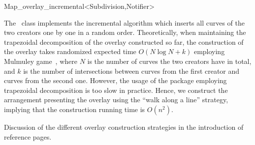 
\ccRefPageBegin


\renewcommand{\ccRefPageBegin}{\begin{ccAdvanced}}
\renewcommand{\ccRefPageEnd}{\end{ccAdvanced}}

\begin{ccRefClass}{Map_overlay_incremental<Subdivision,Notifier>}
\label{OVL_sec:incremental}

The \ccRefName\ class implements the incremental algorithm which inserts 
all curves of the two creators one by one in a random order. 
Theoretically, when maintaining the trapezoidal decomposition of 
the overlay constructed so far, the construction of the overlay 
takes randomized expected time $O(N\log{N} + k)$ employing Mulmuley game~\cite{m-cgitr-93},
where $N$ is the number of curves the two creators have in total, 
and $k$ is the number of intersections between curves 
from the first creator and curves from the second one. 
However, the usage of the 
package employing trapezoidal decomposition is too slow in practice. 
Hence, we construct the arrangement presenting the overlay 
using the ``walk along a line'' strategy, implying that the construction 
running time is $O(n^2)$.


\ccIsModel

\ccInheritsFrom

\ccSeeAlso
   Discussion of the different overlay construction strategies in the introduction
of  reference pages.

\end{ccRefClass}
\renewcommand{\ccRefPageBegin}{}
\renewcommand{\ccRefPageEnd}{}


\ccRefPageEnd
